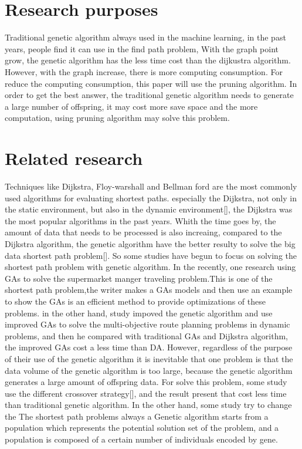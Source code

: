 \documentclass[12pt]{article}
\begin{document}
\section{Research purposes}
Traditional genetic algorithm always used in the machine learning, in the past years, people find it can use in the find path problem, With the graph point grow, the genetic algorithm has the less time cost than the dijkustra algorithm. However, with the graph increase, there is more computing consumption\cite{10.1007/978-3-319-74521-3_20}. For reduce the computing consumption, this paper will use the pruning algorithm. In order to get the best answer, the traditional genetic algorithm needs to generate a large number of offspring, it may cost more save space and the more computation, using pruning algorithm may solve this problem.

\section{Related research}	
Techniques  like Dijkstra, Floy-warshall and Bellman ford are the most commonly used algorithms for evaluating shortest paths. especially the Dijkstra, not only in the static environment, but also in the dynamic environment[], the Dijkstra was the most popular algorithms in the past years. Whith the time goes by, the amount of data that needs to be processed is also increaing, compared to the Dijkstra algorithm, the genetic algorithm have the better resulty to solve the big data shortest path problem[]. So some studies have begun to focus on solving the shortest path  problem with genetic algorithm. In the recently, one research using GAs to solve the supermarket manger traveling problem\cite{Al-hayali2018}.This is one of the shortest path problem,the writer makes a GAs models and then use an example to show the GAs is an efficient method to provide optimizations of these problems.
in the other hand, study impoved the genetic algorithm and use  improved GAs to solve the multi-objective route planning problems in dynamic problems\cite{Kanoh2008}, and then he compared with traditional GAs and Dijkstra algorithm, the improved GAs cost a less time than DA. However, regardless of the purpose of their use of the genetic algorithm it is inevitable that one problem is that the data volume of the genetic algorithm is too large, because the genetic algorithm generates a large amount of offspring data. For solve this problem, some study use the different crossover strategy[], and the result present that cost less time than traditional genetic algorithm. In the other hand, some study try to change the 
The shortest path problems always a Genetic algorithm starts from a population which represents the potential solution set of the problem, and a population is composed of a certain number of individuals encoded by gene. 
\end{document}
